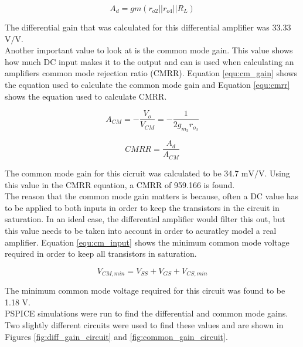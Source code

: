 \documentclass[11pt]{article}
\begin{document}
	\begin{equation}
		\label{equ:diff-gain}
		A_d = gm (r_{o2} || r_{o4} || R_L)
	\end{equation}

	The differential gain that was calculated for this differential amplifier
	was 33.33 $\si\volt/\si\volt$.\\
	\hfill \break
	Another important value to look at is the common mode gain. This value shows
	how much DC input makes it to the output and can is used when calculating
	an amplifiers common mode rejection ratio (CMRR). Equation \ref{equ:cm_gain}
	shows the equation used to calculate the common mode gain and Equation
	\ref{equ:cmrr} shows the equation used to calculate CMRR.

	\begin{equation}
		\label{equ:cm_gain}
		A_{CM} = -\frac{V_o}{V_{CM}} = -\frac{1}{2g_{m_3}r_{o_3}}
	\end{equation}

	\begin{equation}
		\label{equ:cmrr}
		CMRR = \frac{A_d}{A_{CM}}
	\end{equation}

	The common mode gain for this cicruit was calculated to be 34.7
	$\si{\milli\volt}/\si\volt$. Using this value in the CMRR equation,
	a CMRR of 959.166 is found.\\
	\hfill \break
	The reason that the common mode gain matters is because, often a
	DC value has to be applied to both inputs in order to keep the 
	transistors in the circuit in saturation. In an ideal case, the
	differential amplifier would filter this out, but this value needs
	to be taken into account in order to acuratley model a real amplifier.
	Equation \ref{equ:cm_input} shows the minimum common mode voltage 
	required in order to keep all transistors in saturation.

	\begin{equation}
		\label{equ:cm_input}
		V_{CM,min} = V_{SS} + V_{GS} + V_{CS,min}
	\end{equation}

	The minimum common mode voltage required for this circuit was found
	to be 1.18 $\si\volt$.\\
	\hfill \break
	PSPICE simulations were run to find the differential and common mode
	gains. Two slightly different circuits were used to find these values
	and are shown in Figures \ref{fig:diff_gain_circuit} and 
	\ref{fig:common_gain_circuit}.
\end{document}
